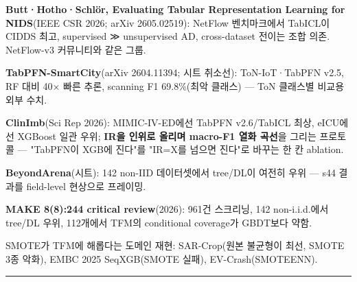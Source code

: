 \par\noindent \textbullet\enspace \textbf{Butt·Hotho·Schlör, Evaluating Tabular Representation Learning for NIDS}(IEEE CSR 2026; arXiv 2605.02519): NetFlow 벤치마크에서 TabICL이 CIDDS 최고, supervised ≫ unsupervised AD, cross-dataset 전이는 조합 의존. NetFlow-v3 커뮤니티와 같은 그룹.


\par\noindent \textbullet\enspace \textbf{TabPFN-SmartCity}(arXiv 2604.11394; 시트 취소선): ToN-IoT·TabPFN v2.5, RF 대비 40× 빠른 추론, scanning F1 69.8\%(최악 클래스) — ToN 클래스별 비교용 외부 수치.


\par\noindent \textbullet\enspace \textbf{ClinImb}(Sci Rep 2026): MIMIC-IV-ED에선 TabPFN v2.6/\allowbreak{}TabICL 최상, eICU에선 XGBoost 일관 우위; \textbf{IR을 인위로 올리며 macro-F1 열화 곡선}을 그리는 프로토콜 — "TabPFN이 XGB에 진다"를 "IR=\allowbreak{}X를 넘으면 진다"로 바꾸는 한 칸 ablation.


\par\noindent \textbullet\enspace \textbf{BeyondArena}(시트): 142 non-IID 데이터셋에서 tree/\allowbreak{}DL이 여전히 우위 — s44 결과를 field-level 현상으로 프레이밍.


\par\noindent \textbullet\enspace \textbf{MAKE 8(8):244 critical review}(2026): 961건 스크리닝, 142 non-i.i.d.에서 tree/\allowbreak{}DL 우위, 112개에서 TFM의 conditional coverage가 GBDT보다 약함.


\par\noindent \textbullet\enspace SMOTE가 TFM에 해롭다는 도메인 재현: SAR-Crop(원본 불균형이 최선, SMOTE 3종 악화), EMBC 2025 SeqXGB(SMOTE 실패), EV-Crash(SMOTEENN).



\medskip\hrule\medskip
